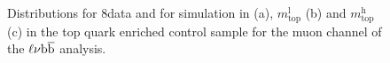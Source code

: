 \begin{figure}[!htb]
\centering
{}\\
\caption{Distributions for 8\TeV data and for simulation in \mWH (a), $m_\mathrm{top}^\mathrm{l}$ (b) and $m_\mathrm{top}^\mathrm{h}$ (c) in the top quark enriched control sample for the muon channel of the $\ell\nu{\mathrm{b}\overline{\mathrm{b}}}$ analysis.}
\label{fig:tt-mtop8TeV}
\end{figure}